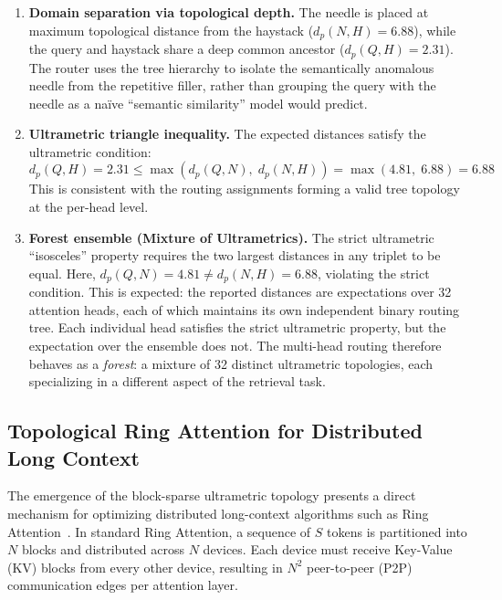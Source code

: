 \documentclass[11pt,a4paper]{article}
\begin{document}
\begin{enumerate}
    \item \textbf{Domain separation via topological depth.} The needle is placed at maximum topological distance from the haystack ($d_p(N, H) = 6.88$), while the query and haystack share a deep common ancestor ($d_p(Q, H) = 2.31$). The router uses the tree hierarchy to isolate the semantically anomalous needle from the repetitive filler, rather than grouping the query with the needle as a na\"ive ``semantic similarity'' model would predict.

    \item \textbf{Ultrametric triangle inequality.} The expected distances satisfy the ultrametric condition:
    \begin{equation}
        d_p(Q, H) = 2.31 \leq \max\!\left(d_p(Q, N),\; d_p(N, H)\right) = \max(4.81,\; 6.88) = 6.88
    \end{equation}
    This is consistent with the routing assignments forming a valid tree topology at the per-head level.

    \item \textbf{Forest ensemble (Mixture of Ultrametrics).} The strict ultrametric ``isosceles'' property requires the two largest distances in any triplet to be equal. Here, $d_p(Q, N) = 4.81 \neq d_p(N, H) = 6.88$, violating the strict condition. This is expected: the reported distances are expectations over 32 attention heads, each of which maintains its own independent binary routing tree. Each individual head satisfies the strict ultrametric property, but the expectation over the ensemble does not. The multi-head routing therefore behaves as a \emph{forest}: a mixture of 32 distinct ultrametric topologies, each specializing in a different aspect of the retrieval task.
\end{enumerate}

\subsection{Topological Ring Attention for Distributed Long Context}
\label{sec:ring_attention}

The emergence of the block-sparse ultrametric topology presents a direct mechanism for optimizing distributed long-context algorithms such as Ring Attention~\citep{liu2023ring}. In standard Ring Attention, a sequence of $S$ tokens is partitioned into $N$ blocks and distributed across $N$ devices. Each device must receive Key-Value (KV) blocks from every other device, resulting in $N^2$ peer-to-peer (P2P) communication edges per attention layer.
\end{document}

